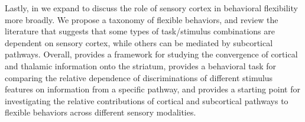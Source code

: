 Lastly, in \ch{\Rev} we expand to discuss the role of sensory cortex in behavioral flexibility more broadly.
%
We propose a taxonomy of flexible behaviors, and review the literature that suggests that some types of task/stimulus combinations are dependent on sensory cortex, while others can be mediated by subcortical pathways.
%
Overall, \ch{\Thstr} provides a framework for studying the convergence of cortical and thalamic information onto the striatum, \ch{\Amod} provides a behavioral task for comparing the relative dependence of discriminations of different stimulus features on information from a specific pathway, and \ch{\Rev} provides a starting point for investigating the relative contributions of cortical and subcortical pathways to flexible behaviors across different sensory modalities. 

